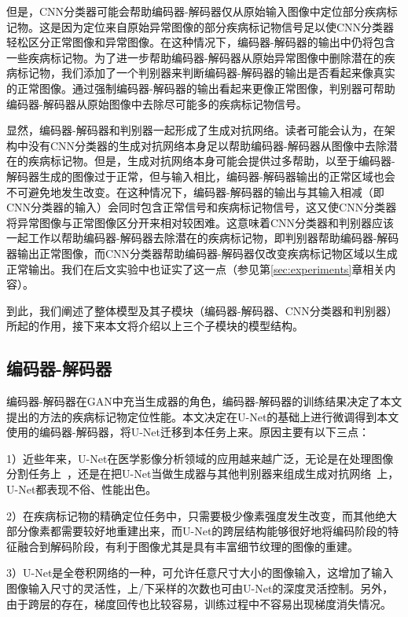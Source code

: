 但是，CNN分类器可能会帮助编码器-解码器仅从原始输入图像中定位部分疾病标记物。这是因为定位来自原始异常图像的部分疾病标记物信号足以使CNN分类器轻松区分正常图像和异常图像。在这种情况下，编码器-解码器的输出中仍将包含一些疾病标记物。为了进一步帮助编码器-解码器从原始异常图像中删除潜在的疾病标记物，我们添加了一个判别器来判断编码器-解码器的输出是否看起来像真实的正常图像。通过强制编码器-解码器的输出看起来更像正常图像，判别器可帮助编码器-解码器从原始图像中去除尽可能多的疾病标记物信号。

显然，编码器-解码器和判别器一起形成了生成对抗网络。读者可能会认为，在架构中没有CNN分类器的生成对抗网络本身足以帮助编码器-解码器从图像中去除潜在的疾病标记物。但是，生成对抗网络本身可能会提供过多帮助，以至于编码器-解码器生成的图像过于正常，但与输入相比，编码器-解码器输出的正常区域也会不可避免地发生改变。在这种情况下，编码器-解码器的输出与其输入相减（即CNN分类器的输入）会同时包含正常信号和疾病标记物信号，这又使CNN分类器将异常图像与正常图像区分开来相对较困难。这意味着CNN分类器和判别器应该一起工作以帮助编码器-解码器去除潜在的疾病标记物，即判别器帮助编码器-解码器输出正常图像，而CNN分类器帮助编码器-解码器仅改变疾病标记物区域以生成正常输出。我们在后文实验中也证实了这一点（参见第\ref{sec:experiments}章相关内容）。

到此，我们阐述了整体模型及其子模块（编码器-解码器、CNN分类器和判别器）所起的作用，接下来本文将介绍以上三个子模块的模型结构。

\subsection{编码器-解码器}\label{subsec:encoder_decoder_model}
编码器-解码器在GAN中充当生成器的角色，编码器-解码器的训练结果决定了本文提出的方法的疾病标记物定位性能。本文决定在U-Net的基础上进行微调得到本文使用的编码器-解码器，将U-Net迁移到本任务上来。原因主要有以下三点：

1）近些年来，U-Net在医学影像分析领域的应用越来越广泛，无论是在处理图像分割任务上~\cite{oktay2018attention, dong2017automatic}，还是在把U-Net当做生成器与其他判别器来组成生成对抗网络~\cite{Han2018SpineGANSS}上，U-Net都表现不俗、性能出色。

2）在疾病标记物的精确定位任务中，只需要极少像素强度发生改变，而其他绝大部分像素都需要较好地重建出来，而U-Net的跨层结构能够很好地将编码阶段的特征融合到解码阶段，有利于图像尤其是具有丰富细节纹理的图像的重建。

3）U-Net是全卷积网络的一种，可允许任意尺寸大小的图像输入，这增加了输入图像输入尺寸的灵活性，上/下采样的次数也可由U-Net的深度灵活控制。另外，由于跨层的存在，梯度回传也比较容易，训练过程中不容易出现梯度消失情况。

